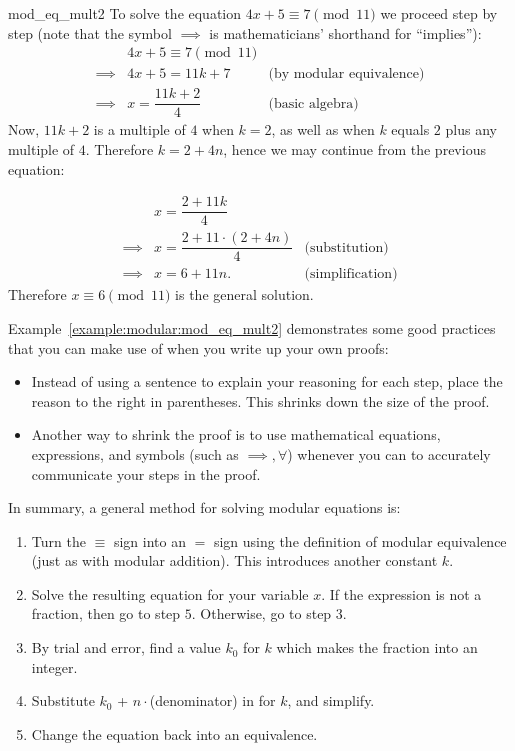 \begin{example}{mod_eq_mult2}
To solve the equation $4x + 5 \equiv 7 \pmod{11}$ we proceed step by step (note that the symbol $\implies$ is mathematicians' shorthand for ``implies''):
\begin{align*}
&4x + 5 \equiv 7 \pmod{11} \\
 \implies &4x + 5 = 11k + 7&\text{(by modular equivalence)}\\ 
\implies &x = \dfrac{11k + 2}{4}&\text{(basic algebra)}
\end{align*}
Now, $11k + 2$ is a multiple of $4$ when $k = 2$, as well as when $k$ equals $2$ plus any multiple of $4$. 
Therefore $k = 2 + 4n$, hence we may continue from the previous equation:

\begin{align*}
&x = \dfrac{2 + 11k }{4}\\
\implies &x = \dfrac{ 2 + 11 \cdot (2 + 4n)}{4} &\text{(substitution)} \\
\implies &x = 6 + 11n. &\text{(simplification)}
\end{align*}
Therefore $x \equiv 6 \pmod{11}$ is the general solution.
\end{example}

\begin{rem}
Example~\ref{example:modular:mod_eq_mult2} demonstrates some good practices that you can make use of when you write up your own proofs:
\begin{itemize}
\item
Instead of using a sentence to explain your reasoning for each step, place the reason to the right in parentheses.  This shrinks down the size of the proof.
\item  
Another way to shrink the proof is to use mathematical equations, expressions, and symbols (such as $\implies, \forall$) whenever you can to accurately communicate your steps in the proof.  
\end{itemize}
\end{rem}



In summary, a general method for solving modular equations is:

\begin{enumerate}[1.]
\item
Turn the $ \equiv $ sign into an $=$ sign using the definition of modular equivalence (just as with modular addition). This introduces another constant $k$.
\item
Solve the resulting equation for your variable $x$. If the expression is not a fraction, then
 go to step $5$.
Otherwise, go to step $3$.
\item
By trial and error, find a value $k_0$ for $k$ which makes the fraction into an integer.
\item
Substitute  $k_0$ + $n \cdot$(denominator) in for $k$, and simplify.
\item
Change the equation back into an equivalence.
\end{enumerate}

